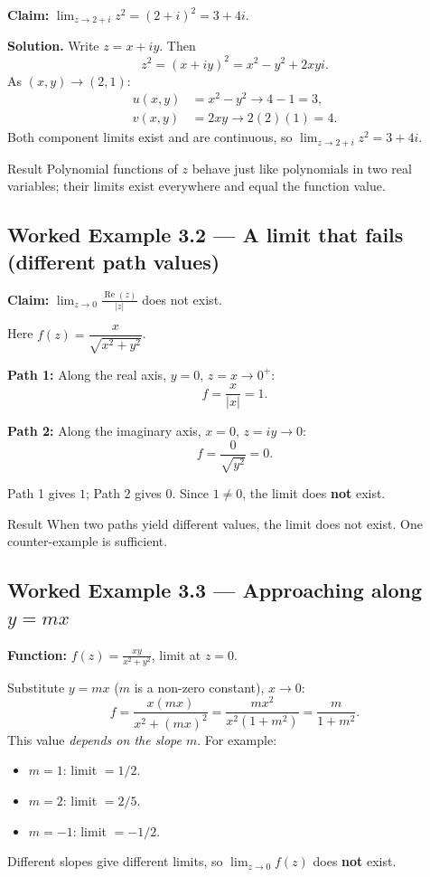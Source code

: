 \documentclass[12pt,a4paper]{article}
\begin{document}
\textbf{Claim:} $\displaystyle\lim_{z \to 2+i} z^2 = (2+i)^2 = 3+4i$.

\textbf{Solution.}  Write $z = x + iy$.  Then
\[
  z^2 = (x+iy)^2 = x^2 - y^2 + 2xyi.
\]
As $(x,y) \to (2,1)$:
\begin{align*}
  u(x,y) &= x^2 - y^2 \to 4 - 1 = 3, \\
  v(x,y) &= 2xy \to 2(2)(1) = 4.
\end{align*}
Both component limits exist and are continuous, so
$\lim_{z \to 2+i} z^2 = 3 + 4i$.

\begin{learnbox}{Result}
Polynomial functions of $z$ behave just like polynomials in two real variables;
their limits exist everywhere and equal the function value.
\end{learnbox}

\subsection*{Worked Example 3.2 --- A limit that fails (different path values)}

\textbf{Claim:} $\displaystyle\lim_{z \to 0} \frac{\operatorname{Re}(z)}{|z|}$ does not exist.

Here $f(z) = \dfrac{x}{\sqrt{x^2+y^2}}$.

\textbf{Path 1:} Along the real axis, $y = 0$, $z = x \to 0^{+}$:
\[
  f = \frac{x}{|x|} = 1.
\]

\textbf{Path 2:} Along the imaginary axis, $x = 0$, $z = iy \to 0$:
\[
  f = \frac{0}{\sqrt{y^2}} = 0.
\]

Path 1 gives $1$; Path 2 gives $0$.  Since $1 \neq 0$, the limit does \textbf{not} exist.

\begin{learnbox}{Result}
When two paths yield different values, the limit does not exist.
One counter-example is sufficient.
\end{learnbox}

\subsection*{Worked Example 3.3 --- Approaching along $y = mx$}

\textbf{Function:} $\displaystyle f(z) = \frac{xy}{x^2 + y^2}$, limit at $z = 0$.

Substitute $y = mx$ ($m$ is a non-zero constant), $x \to 0$:
\[
  f = \frac{x(mx)}{x^2 + (mx)^2} = \frac{mx^2}{x^2(1+m^2)} = \frac{m}{1+m^2}.
\]
This value \emph{depends on the slope $m$}.  For example:
\begin{itemize}[nosep]
  \item $m = 1$: limit $= 1/2$.
  \item $m = 2$: limit $= 2/5$.
  \item $m = -1$: limit $= -1/2$.
\end{itemize}
Different slopes give different limits, so $\lim_{z \to 0} f(z)$ does \textbf{not} exist.
\end{document}
